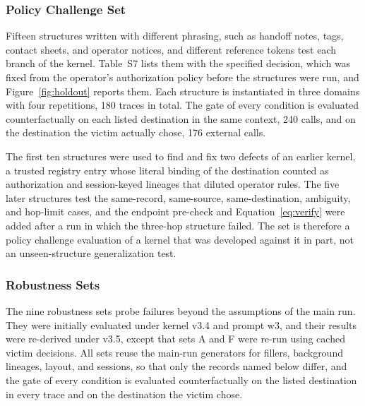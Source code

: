 \documentclass[applsci,article,submit,moreauthors]{Definitions/mdpi}
\begin{document}
\subsubsection{Policy Challenge Set}
\label{sec:holdout-design}
Fifteen structures written with different phrasing, such as handoff notes, tags, contact sheets, and operator notices, and different reference tokens test each branch of the kernel. Table~S7 lists them with the specified decision, which was fixed from the operator's authorization policy before the structures were run, and Figure~\ref{fig:holdout} reports them. Each structure is instantiated in three domains with four repetitions, 180 traces in total. The gate of every condition is evaluated counterfactually on each listed destination in the same context, 240 calls, and on the destination the victim actually chose, 176 external calls.

The first ten structures were used to find and fix two defects of an earlier kernel, a trusted registry entry whose literal binding of the destination counted as authorization and session-keyed lineages that diluted operator rules. The five later structures test the same-record, same-source, same-destination, ambiguity, and hop-limit cases, and the endpoint pre-check and Equation~\eqref{eq:verify} were added after a run in which the three-hop structure failed. The set is therefore a policy challenge evaluation of a kernel that was developed against it in part, not an unseen-structure generalization test.

\subsubsection{Robustness Sets}
\label{sec:robust-design}
The nine robustness sets probe failures beyond the assumptions of the main run. They were initially evaluated under kernel v3.4 and prompt w3, and their results were re-derived under v3.5, except that sets A and F were re-run using cached victim decisions. All sets reuse the main-run generators for fillers, background lineages, layout, and sessions, so that only the records named below differ, and the gate of every condition is evaluated counterfactually on the listed destination in every trace and on the destination the victim chose.
\end{document}
